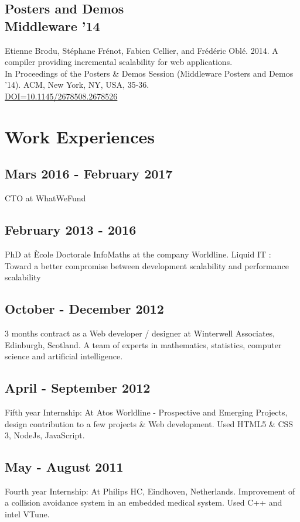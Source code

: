 	\subsection{Posters and Demos\\Middleware '14}{
		Etienne Brodu, Stéphane Frénot, Fabien Cellier, and Frédéric Oblé. 2014.
		A compiler providing incremental scalability for web applications.\\
		In Proceedings of the Posters \& Demos Session (Middleware Posters and Demos '14).
		ACM, New York, NY, USA, 35-36.\\
		\href{http://doi.acm.org/10.1145/2678508.2678526}{DOI=10.1145/2678508.2678526}
	}

\section{Work Experiences}

	\subsection{Mars 2016 - February 2017}
		{CTO at WhatWeFund}

	\subsection{February 2013 - 2016}
		{PhD at Ècole Doctorale InfoMaths at the company Worldline. Liquid IT : Toward a better compromise between development scalability and performance scalability}

	\subsection{October - December 2012}
		{3 months contract as a Web developer / designer at Winterwell Associates, Edinburgh, Scotland. A team of experts in mathematics, statistics, computer science and artificial intelligence.}

	\subsection{April - September 2012}
		{Fifth year Internship: At Atos Worldline - Prospective and Emerging Projects, design contribution to a few projects \& Web development. Used HTML5 \& CSS 3, NodeJs, JavaScript.}

	\subsection{May - August 2011}
		{Fourth year Internship: At Philips HC, Eindhoven, Netherlands. Improvement of a collision avoidance system in an embedded medical system. Used C++ and intel VTune.}

